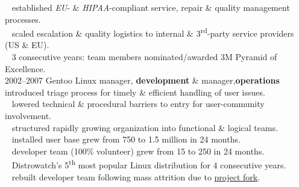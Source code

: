 \documentclass[]{friggeri-cv} %
\begin{document}
\begin{entrylist}
{{\tiny {}} ~ established \emph{EU}- \& \emph{HIPAA}-compliant service, repair \& quality management processes.\\
{\tiny {}} ~ scaled escalation \& quality logistics to internal \& 3\textsuperscript{rd}-party service providers (US \& EU).\\
{\tiny {}} ~ 3 consecutive years: team members nominated/awarded 3M Pyramid of Excellence.\\}
\entry
{2002--2007}
{Gentoo Linux}
{manager, {\textbf{\color{DarkGray}development}} \& manager,{\textbf{\color{DarkGray}operations}}}
{{\tiny {}} ~ introduced triage process for timely \& efficient handling of user issues.\\
{\tiny {}} ~ lowered technical \& procedural barriers to entry for user-community involvement.\\
{\tiny {}} ~ structured rapidly growing organization into functional \& logical teams.\\

{\tiny {}} ~ installed user base grew from 750 to 1.5 million in 24 months.\\
{\tiny {}} ~ developer team (100\% volunteer) grew from 15 to 250 in 24 months.\\
{\tiny {}} ~ Distrowatch's 5\textsuperscript{th} most popular Linux distribution for 4 consecutive years.\\
{\tiny {}} ~ rebuilt developer team following mass attrition due to \href{http://www.gentoo.org/news/en/gwn/20030630-newsletter.xml}{project fork}.\\}
\end{entrylist}
\end{document}
